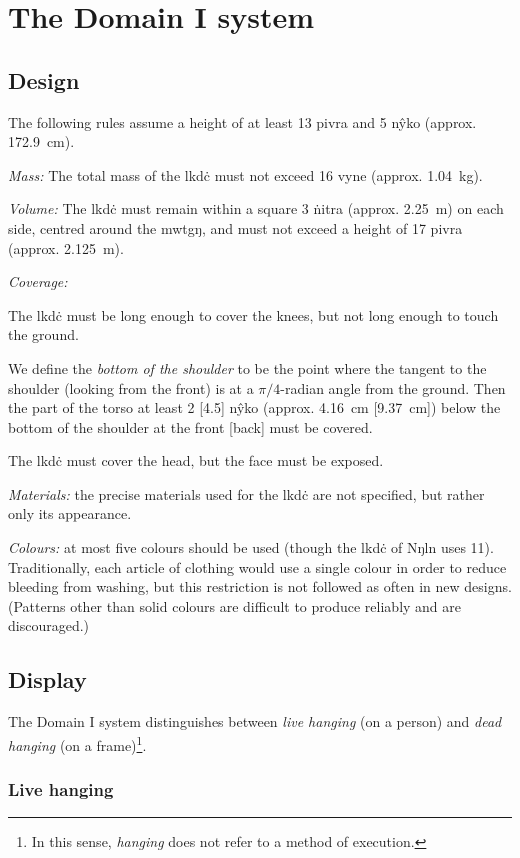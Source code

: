 \documentclass{book}
\begin{document}
\section{The Domain I system}

\subsection{Design}

The following rules assume a height of at least 13 pivra and 5 nŷko (approx. 172.9~cm).

\emph{Mass:} The total mass of the lkdċ must not exceed 16 vyne (approx. 1.04~kg).

\emph{Volume:} The lkdċ must remain within a square 3 ṅitra (approx. 2.25~m) on each side, centred around the mwtgŋ, and must not exceed a height of 17 pivra (approx. 2.125~m).

\emph{Coverage:}

The lkdċ must be long enough to cover the knees, but not long enough to touch the ground.

We define the \emph{bottom of the shoulder} to be the point where the tangent to the shoulder (looking from the front) is at a $\pi/4$-radian angle from the ground. Then the part of the torso at least 2 [4.5] nŷko (approx. 4.16~cm [9.37~cm]) below the bottom of the shoulder at the front [back] must be covered.

The lkdċ must cover the head, but the face must be exposed.

\emph{Materials:} the precise materials used for the lkdċ are not specified, but rather only its appearance.

\emph{Colours:} at most five colours should be used (though the lkdċ of Nŋln uses 11). Traditionally, each article of clothing would use a single colour in order to reduce bleeding from washing, but this restriction is not followed as often in new designs. (Patterns other than solid colours are difficult to produce reliably and are discouraged.)

\subsection{Display}

The Domain I system distinguishes between \emph{live hanging} (on a person) and \emph{dead hanging} (on a frame)\footnote{In this sense, \emph{hanging} does not refer to a method of execution.}.

\subsubsection{Live hanging}
\end{document}
